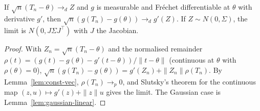 \begin{theorem}
\label{thm:delta-vec}
\leanok
{}
If $\sqrt n(T_n-\theta)\to_d Z$ and $g$ is measurable and Fr\'echet differentiable at $\theta$ with derivative $g'$, then
$\sqrt n(g(T_n) - g(\theta))\to_d g'(Z)$. If $Z\sim N(0,\Sigma)$, the limit is $N(0, J\Sigma J^\top)$ with $J$ the
Jacobian.
\end{theorem}
\begin{proof}
\leanok
With $Z_n = \sqrt n(T_n-\theta)$ and the normalised remainder $\rho(t) = (g(t)-g(\theta)-g'(t-\theta))/\|t-\theta\|$
(continuous at $\theta$ with $\rho(\theta) = 0$), $\sqrt n(g(T_n)-g(\theta)) = g'(Z_n) + \|Z_n\|\rho(T_n)$. By
Lemma~\ref{lem:const-vec}, $\rho(T_n)\to_p 0$, and Slutsky's theorem for the continuous map $(z,u)\mapsto g'(z) + \|z\|u$
gives the limit. The Gaussian case is Lemma~\ref{lem:gaussian-linear}.
\end{proof}
